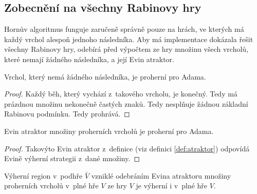 \subsection{Zobecnění na všechny Rabinovy hry} \label{subsec:horn:implementace:zobecneni}
Hornův algoritmus funguje zaručeně správně pouze na hrách, ve kterých má každý vrchol alespoň jednoho následníka. Aby má implementace dokázala řešit všechny Rabinovy hry, odebírá před výpočtem ze hry množinu všech vrcholů, které nemají žádného následníka, a její Evin atraktor.
\begin{theorem}
\label{theorem:vrcholbeznasledniku}
Vrchol, který nemá žádného následníka, je proherní pro Adama.
\end{theorem}
\begin{proof}
Každý běh, který vychází z~takového vrcholu, je konečný. Tedy má prázdnou množinu nekonečně častých znaků. Tedy nesplňuje žádnou základní Rabinovu podmínku. Tedy prohrává.
\end{proof}
\begin{theorem}
Evin atraktor množiny proherních vrcholů je proherní pro Adama.
\end{theorem}
\begin{proof}
Takovýto Evin atraktor z~definice (viz definici \ref{def:atraktor}) odpovídá Evině výherní strategii z~dané množiny.
\end{proof}
\begin{theorem}
Výherní region v~podhře $\bar{V}$ vzniklé odebráním Evina atraktoru množiny proherních vrcholů v~plné hře $V$ ze hry $V$ je výherní i v~plné hře $V$.
\end{theorem}
